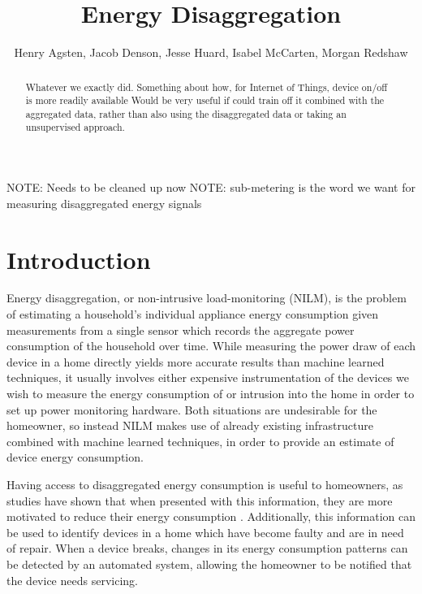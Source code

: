 \documentclass{article}
\title{Energy Disaggregation}
\author{Henry Agsten, Jacob Denson, Jesse Huard, Isabel McCarten, Morgan Redshaw}
\date{}
\begin{document}
\maketitle

\begin{abstract}
Whatever we exactly did. Something about how, for Internet of Things, device on/off is more readily available
Would be very useful if could train off it combined with the aggregated data, rather than also using the disaggregated data or taking an unsupervised approach.
\end{abstract}

NOTE: Needs to be cleaned up now
NOTE: sub-metering is the word we want for measuring disaggregated energy signals

\section{Introduction}

Energy disaggregation, or non-intrusive load-monitoring (NILM), is the problem of estimating a household's individual appliance energy consumption given measurements from a single sensor which records the aggregate power consumption of the household over time.
While measuring the power draw of each device in a home directly yields more accurate results than machine learned techniques, it usually involves either expensive instrumentation of the devices we wish to measure the energy consumption of or intrusion into the home in order to set up power monitoring hardware.
Both situations are undesirable for the homeowner, so instead NILM makes use of already existing infrastructure combined with machine learned techniques, in order to provide an estimate of device energy consumption.

Having access to disaggregated energy consumption is useful to homeowners, as studies have shown that when presented with this information, they are more motivated to reduce their energy consumption \cite{Darby}.
Additionally, this information can be used to identify devices in a home which have become faulty and are in need of repair.
When a device breaks, changes in its energy consumption patterns can be detected by an automated system, allowing the homeowner to be notified that the device needs servicing.
\end{document}

